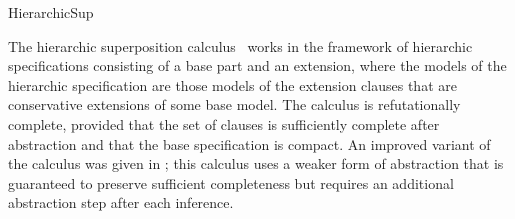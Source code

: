 \begin{entry}{HierarchicSup}
\begin{history}
The hierarchic superposition calculus~\cite{BachmairGanzingerWaldmann1992ALP,BachmairGanzingerWaldmann1994AAECC}
works in the framework of hierarchic specifications
consisting of a base part and an extension,
where the models of the hierarchic specification
are those models of the extension clauses that
are conservative extensions of some base model.
The calculus is refutationally complete,
provided that the set of clauses is sufficiently
complete after abstraction and that the base specification is compact.
An improved variant of the calculus
was given in \cite{BaumgartnerWaldmann2013CADE};
this calculus uses a weaker form of abstraction that is
guaranteed to preserve sufficient completeness
but requires an additional abstraction step after each inference.

\end{history}














\end{entry}
